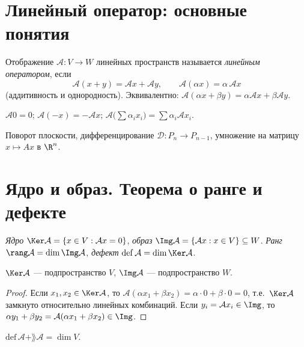 \section{Линейный оператор: основные понятия}

\begin{definition}
Отображение $\mathcal A\colon V\to W$ линейных пространств называется \emph{линейным оператором},
если
\[
  \mathcal A(x+y)=\mathcal Ax+\mathcal Ay,\qquad \mathcal A(\alpha x)=\alpha\,\mathcal Ax
\]
(аддитивность и однородность). Эквивалентно: $\mathcal A(\alpha x+\beta y)=\alpha\mathcal Ax+\beta\mathcal Ay$.
\end{definition}

\begin{property}\leavevmode
$\mathcal A0=0$; $\mathcal A(-x)=-\mathcal Ax$; $\mathcal A\bigl(\sum\alpha_i x_i\bigr)=\sum\alpha_i\mathcal Ax_i$.
\end{property}

\begin{example}
Поворот плоскости, дифференцирование $\mathcal D\colon P_n\to P_{n-1}$, умножение на матрицу
$x\mapsto Ax$ в $\R^n$.
\end{example}

\section{Ядро и образ. Теорема о ранге и дефекте}

\begin{definition}
\emph{Ядро} $\Ker\mathcal A=\{x\in V:\mathcal Ax=0\}$, \emph{образ}
$\Img\mathcal A=\{\mathcal Ax:x\in V\}\subseteq W$. \emph{Ранг} $\rang\mathcal A=\dim\Img\mathcal A$,
\emph{дефект} $\mathrm{def}\,\mathcal A=\dim\Ker\mathcal A$.
\end{definition}

\begin{theorem}
$\Ker\mathcal A$ — подпространство $V$, $\Img\mathcal A$ — подпространство $W$.
\end{theorem}

\begin{proof}
Если $x_1,x_2\in\Ker\mathcal A$, то $\mathcal A(\alpha x_1+\beta x_2)=\alpha\cdot0+\beta\cdot0=0$,
т.е.\ $\Ker\mathcal A$ замкнуто относительно линейных комбинаций. Если $y_i=\mathcal Ax_i\in\Img$,
то $\alpha y_1+\beta y_2=\mathcal A(\alpha x_1+\beta x_2)\in\Img$.
\end{proof}

\begin{theorem}
$\mathrm{def}\,\mathcal A+\rang\mathcal A=\dim V$.
\end{theorem}

